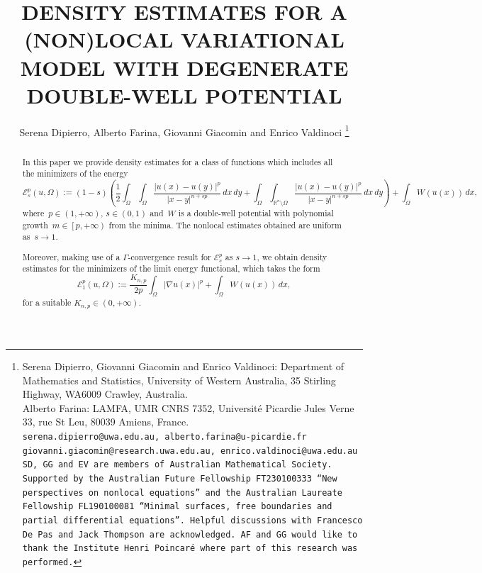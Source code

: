 \documentclass[12pt]{article}
\newcommand{\R}{\mathbb{R}}
\numberwithin{equation}{section}
\begin{document}
\title{DENSITY ESTIMATES
FOR A (NON)LOCAL VARIATIONAL MODEL
 WITH DEGENERATE DOUBLE-WELL POTENTIAL}

\author{Serena Dipierro, Alberto Farina, Giovanni Giacomin and Enrico Valdinoci
\thanks{Serena Dipierro, Giovanni Giacomin and Enrico Valdinoci:
Department of Mathematics and Statistics,
University of Western Australia, 35 Stirling Highway,
WA6009 Crawley, Australia.\\
Alberto Farina: LAMFA, UMR CNRS 7352, 
	Universit\'e Picardie Jules Verne
	33, rue St Leu, 80039 Amiens, France.\\
{\tt serena.dipierro@uwa.edu.au, alberto.farina@u-picardie.fr
giovanni.giacomin@research.uwa.edu.au,
enrico.valdinoci@uwa.edu.au\\
SD, GG and EV are members of Australian Mathematical Society.
Supported by the Australian Future Fellowship
FT230100333 ``New perspectives on nonlocal equations''
and the Australian Laureate Fellowship FL190100081 ``Minimal
surfaces, free boundaries and partial differential equations''. 
Helpful discussions with Francesco De Pas and Jack Thompson are acknowledged. AF and GG would like to thank the Institute Henri Poincar\'e where part of this research was performed.}}}




\maketitle


\begin{abstract}
In this paper
we provide density estimates for a class of functions which includes all the minimizers of the energy 
\begin{equation*}
\mathcal{E}_s^p(u,\Omega):=(1-s)\left(\frac{1}{2}\int_{\Omega}\int_{\Omega}\frac{\left|u(x)-u(y)\right|^p}{\left|x-y\right|^{n+sp}}\,dx\,dy +\int_{\Omega}\int_{\R^n\setminus \Omega}\frac{\left|u(x)-u(y)\right|^p}{\left|x-y\right|^{n+sp}}\,dx\,dy\right)+\int_{\Omega}W(u(x))\,dx,
\end{equation*}
where~$p\in (1,+\infty)$, $s \in \left(0,1\right)$ and~$W$ is a double-well potential with polynomial growth~$m\in \left[p,+\infty\right)$ from the minima. The nonlocal estimates obtained are uniform as~$s\to1$.

Moreover, making use of a $\Gamma$-convergence result for $\mathcal{E}_s^p$ as $s\to 1$, we obtain density estimates for the minimizers  of the limit energy functional, which takes the form
\begin{equation*}
\mathcal{E}_1^p(u,\Omega):=\frac{K_{n,p}}{2p}\int_{\Omega} \left|\nabla u(x)\right|^p+\int_{\Omega} W(u(x))\,dx,
\end{equation*} 
for a suitable $K_{n,p}\in (0,+\infty)$.


\end{abstract}
\end{document}
